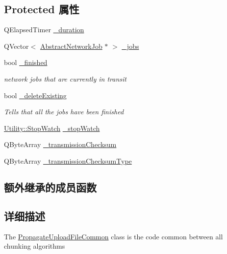 \subsection*{Protected 属性}
\begin{DoxyCompactItemize}
\item 
Q\+Elapsed\+Timer \hyperlink{class_o_c_c_1_1_propagate_upload_file_common_a379cada64a1c9d01bbafb4eb6da7b664}{\+\_\+duration}
\item 
Q\+Vector$<$ \hyperlink{class_o_c_c_1_1_abstract_network_job}{Abstract\+Network\+Job} $\ast$ $>$ \hyperlink{class_o_c_c_1_1_propagate_upload_file_common_a5f420b4fe9de4c2a3e75152b677a3a72}{\+\_\+jobs}
\item 
bool \hyperlink{class_o_c_c_1_1_propagate_upload_file_common_ad43eabcb37e4bf34f089c216dd01a497}{\+\_\+finished}
\begin{DoxyCompactList}\small\item\em network jobs that are currently in transit \end{DoxyCompactList}\item 
bool \hyperlink{class_o_c_c_1_1_propagate_upload_file_common_ab2ce724d452db757662815a3d8df55c6}{\+\_\+delete\+Existing}
\begin{DoxyCompactList}\small\item\em Tells that all the jobs have been finished \end{DoxyCompactList}\item 
\hyperlink{class_o_c_c_1_1_utility_1_1_stop_watch}{Utility\+::\+Stop\+Watch} \hyperlink{class_o_c_c_1_1_propagate_upload_file_common_aef794dc6461625030a6ca261a983ad13}{\+\_\+stop\+Watch}
\item 
Q\+Byte\+Array \hyperlink{class_o_c_c_1_1_propagate_upload_file_common_a33f403366131890e5160902fa8a8301e}{\+\_\+transmission\+Checksum}
\item 
Q\+Byte\+Array \hyperlink{class_o_c_c_1_1_propagate_upload_file_common_ae880676e923ae4844a453e990cb8a189}{\+\_\+transmission\+Checksum\+Type}
\end{DoxyCompactItemize}
\subsection*{额外继承的成员函数}


\subsection{详细描述}
The \hyperlink{class_o_c_c_1_1_propagate_upload_file_common}{Propagate\+Upload\+File\+Common} class is the code common between all chunking algorithms

